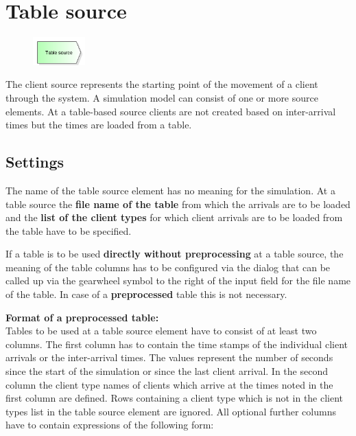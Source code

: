 \section{Table source}
\label{ref:ModelElementSourceTable}

\begin{figure}
\vspace{-22pt}
\includegraphics[width=2cm]{imageModelElementSourceTable.png}
\vspace{-22pt}
\end{figure}

The client source represents the starting point of the movement of a client through the system.
A simulation model can consist of one or more source elements.
At a table-based source clients are not created based on inter-arrival times but the
times are loaded from a table.

\subsection*{Settings}

The name of the table source element has no meaning for the simulation.
At a table source the \textbf{file name of the table} from which the arrivals
are to be loaded and the \textbf{list of the client types} for which client
arrivals are to be loaded from the table have to be specified.

If a table is to be used \textbf{directly without preprocessing} at a table source, 
the meaning of the table columns has to be configured via the dialog that can be
called up via the gearwheel symbol to the right of the input field
for the file name of the table. In case of a \textbf{preprocessed} table this is not necessary.

\textbf{Format of a preprocessed table:}~\\
Tables to be used at a table source element have to consist of at least two columns.
The first column has to contain the time stamps of the individual client arrivals
or the inter-arrival times. The values represent the number of seconds since the
start of the simulation or since the last client arrival.
In the second column the client type names of clients which arrive at the times
noted in the first column are defined. Rows containing a client type which is
not in the client types list in the table source element are ignored.
All optional further columns have to contain expressions of the following form:

